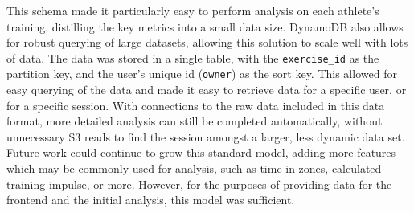 This schema made it particularly easy to perform analysis on each athlete's training, distilling the key metrics into a small data size. DynamoDB also allows for robust querying of large datasets, allowing this solution to scale well with lots of data. The data was stored in a single table, with the \texttt{exercise\_id} as the partition key, and the user's unique id (\texttt{owner}) as the sort key. This allowed for easy querying of the data and made it easy to retrieve data for a specific user, or for a specific session. With connections to the raw data included in this data format, more detailed analysis can still be completed automatically, without unnecessary S3 reads to find the session amongst a larger, less dynamic data set. Future work could continue to grow this standard model, adding more features which may be commonly used for analysis, such as time in zones, calculated training impulse, or more. However, for the purposes of providing data for the frontend and the initial analysis, this model was sufficient.

